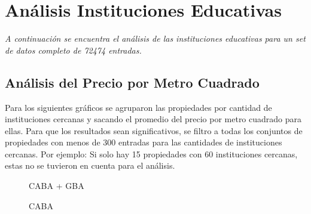 \documentclass[a4paper, 10pt]{article}
\begin{document}
		\section{Análisis Instituciones Educativas}
			\emph{A continuación se encuentra el análisis de las instituciones educativas para un set 
			de datos completo de 72474 entradas.}
			\subsection{Análisis del Precio por Metro Cuadrado}
				Para los siguientes gráficos se agruparon las propiedades por cantidad de instituciones 
				cercanas y sacando el promedio del precio por metro cuadrado para ellas. 
				Para que los resultados sean significativos, 
				se filtro a todas los conjuntos de propiedades con menos de 300 entradas para las 
				cantidades de instituciones cercanas. Por ejemplo: Si solo hay 15 propiedades con 
				60 instituciones cercanas, estas no se tuvieron en cuenta para el análisis.
				\begin{figure}
    				\centering
    				\caption{CABA + GBA}
				\end{figure}
				\begin{figure}
    				\centering
    				\caption{CABA}
				\end{figure}
\end{document}
